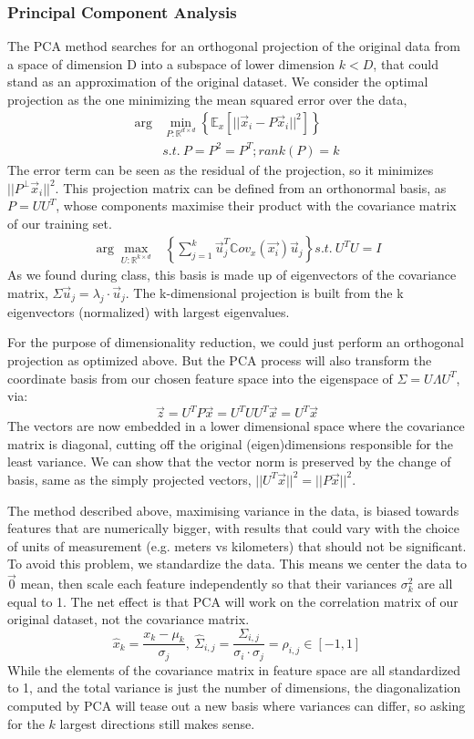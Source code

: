 \documentclass[twocolumn]{article}
\begin{document}
\subsubsection{Principal Component Analysis}
The PCA method searches for an orthogonal projection of the original data from a space of dimension D into a subspace of lower dimension $k < D$, that could stand as an approximation of the original dataset. We consider the optimal projection as the one minimizing the mean squared error over the data,
\begin{align*}
\arg &\min \limits_{P : \mathbb{R}^{d \times d}} \left\{ \mathbb{E}_x \left[ ||\Vec{x}_i - P\Vec{x}_i||^2 \right] \right\} \\
&s.t. \  P = P^2 = P^T; rank(P) = k
\end{align*}
The error term can be seen as the residual of the projection, so it minimizes $||P^{\perp}\Vec{x}_i||^2$. This projection matrix can be defined from an orthonormal basis, as $P = UU^T$, whose components maximise their product with the covariance matrix of our training set.
\begin{align*}
 \arg \max \limits_{U : \mathbb{R}^{k \times d}} &\left\{ \sum^k_{j=1}  \Vec{u}^T_j \mathbb{C}ov_x({\Vec{x_i}}) \Vec{u}_j \right\} s.t. \ U^TU = I
\end{align*}
As we found during class, this basis is made up of eigenvectors of the covariance matrix, $\Sigma\Vec{u}_j = \lambda_j \cdot \Vec{u}_j$. The k-dimensional projection is built from the k eigenvectors (normalized) with largest eigenvalues.

For the purpose of dimensionality reduction, we could just perform an orthogonal projection as optimized above. But the PCA process will also transform the coordinate basis from our chosen feature space into the eigenspace of $\Sigma = U \Lambda U^T$, via:
$$\Vec{z} = U^TP\Vec{x} = U^TUU^T\Vec{x} = U^T\Vec{x}$$
The vectors are now embedded in a lower dimensional space where the covariance matrix is diagonal, cutting off the original (eigen)dimensions responsible for the least variance. We can show that the vector norm is preserved by the change of basis, same as the simply projected vectors, $||U^T\Vec{x}||^2 = ||P\Vec{x}||^2$.

The method described above, maximising variance in the data, is biased towards features that are numerically bigger, with results that could vary with the choice of units of measurement (e.g. meters vs kilometers) that should not be significant. To avoid this problem, we standardize the data. This means we center the data to $\Vec{0}$ mean, then scale each feature independently so that their variances $\sigma^2_k$ are all equal to 1. The net effect is that PCA will work on the correlation matrix of our original dataset, not the covariance matrix.
$$\hat{x}_k = \frac{x_k - \mu_k}{\sigma_j}, \ \hat{\Sigma}_{i,j} = \frac{\Sigma_{i,j}}{\sigma_i \cdot \sigma_j} = \rho_{i,j} \in [-1, 1]$$
While the elements of the covariance matrix in feature space are all standardized to 1, and the total variance is just the number of dimensions, the diagonalization computed by PCA will tease out a new basis where variances can differ, so asking for the $k$ largest directions still makes sense.
\end{document}
